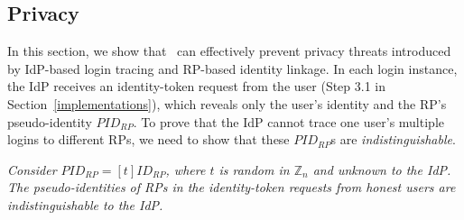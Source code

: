 {\subsection{Privacy}
\label{sec-:analysis}
In this section, we show that \usso~can effectively prevent privacy threats introduced by IdP-based login tracing and RP-based identity linkage. \newc In each login instance, the IdP receives an identity-token request from the user (Step 3.1 in Section~\ref{implementations}), which reveals only the user's identity and the RP's pseudo-identity $PID_{RP}$. To prove that the IdP cannot trace one user's multiple logins to different RPs, we need to show that these $PID_{RP}$s are \emph{indistinguishable}. 

\vspace{1mm}
 {\em Consider $PID_{RP} = [t]ID_{RP}$, where $t$ is random in $\mathbb{Z}_n$ and unknown to the IdP. The pseudo-identities of RPs in the identity-token requests from honest users are indistinguishable to the IdP.}

\vspace{0.75mm}
}
